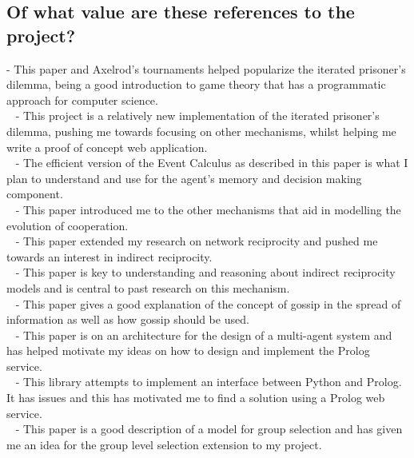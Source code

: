 \documentclass{article}
\begin{document}
\subsection*{Of what value are these references to the project?}
\cite{evolution_of_cooperation} - This paper and Axelrod's tournaments helped popularize the iterated prisoner's dilemma, being a good introduction to game theory that has a programmatic approach for computer science.\\
~\cite{axelrodproject} - This project is a relatively new implementation of the iterated prisoner's dilemma, pushing me towards focusing on other mechanisms, whilst helping me write a proof of concept web application.\\
~\cite{mvfcec} - The efficient version of the Event Calculus as described in this paper is what I plan to understand and use for the agent's memory and decision making component.\\
~\cite{five_rules_coop} - This paper introduced me to the other mechanisms that aid in modelling the evolution of cooperation.\\
~\cite{spatial} - This paper extended my research on network reciprocity and pushed me towards an interest in indirect reciprocity.\\
~\cite{evol_indirect_image} - This paper is key to understanding and reasoning about indirect reciprocity models and is central to past research on this mechanism.\\
~\cite{gossip_alt} - This paper gives a good explanation of the concept of gossip in the spread of information as well as how gossip should be used.\\
~\cite{prosocs} - This paper is on an architecture for the design of a multi-agent system and has helped motivate my ideas on how to design and implement the Prolog service.\\
~\cite{pyswip} - This library attempts to implement an interface between Python and Prolog. It has issues and this has motivated me to find a solution using a Prolog web service.\\
~\cite{multilevel_nowak} - This paper is a good description of a model for group selection and has given me an idea for the group level selection extension to my project.\\
\end{document}
